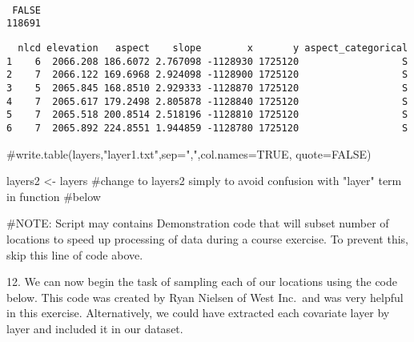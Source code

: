 \documentclass[
  letterpaper,
]{book}
\newenvironment{Shaded}{\begin{snugshade}}{\end{snugshade}}
\newcommand{\CommentTok}[1]{\textcolor[rgb]{0.37,0.37,0.37}{#1}}
\newcommand{\FunctionTok}[1]{\textcolor[rgb]{0.28,0.35,0.67}{#1}}
\newcommand{\NormalTok}[1]{\textcolor[rgb]{0.00,0.23,0.31}{#1}}
\newcommand{\OtherTok}[1]{\textcolor[rgb]{0.00,0.23,0.31}{#1}}
\newcommand{\SpecialCharTok}[1]{\textcolor[rgb]{0.37,0.37,0.37}{#1}}
\begin{document}
\begin{verbatim}

 FALSE 
118691 
\end{verbatim}

\begin{Shaded}
\end{Shaded}

\begin{verbatim}
  nlcd elevation   aspect    slope        x       y aspect_categorical
1    6  2066.208 186.6072 2.767098 -1128930 1725120                  S
2    7  2066.122 169.6968 2.924098 -1128900 1725120                  S
3    5  2065.845 168.8510 2.929333 -1128870 1725120                  S
4    7  2065.617 179.2498 2.805878 -1128840 1725120                  S
5    7  2065.518 200.8514 2.518196 -1128810 1725120                  S
6    7  2065.892 224.8551 1.944859 -1128780 1725120                  S
\end{verbatim}

\begin{Shaded}
\begin{Highlighting}[]
\CommentTok{\#write.table(layers,"layer1.txt",sep=",",col.names=TRUE, quote=FALSE)}

\NormalTok{layers2 }\OtherTok{\textless{}{-}}\NormalTok{ layers }\CommentTok{\#change to layers2 simply to avoid confusion with "layer" term in function }
\CommentTok{\#below}
\end{Highlighting}
\end{Shaded}

\#NOTE: Script may contains Demonstration code that will subset number
of locations to speed up processing of data during a course exercise. To
prevent this, skip this line of code above.

12. We can now begin the task of sampling each of our locations using
the code below. This code was created by Ryan Nielsen of West Inc.~and
was very helpful in this exercise. Alternatively, we could have
extracted each covariate layer by layer and included it in our dataset.
\end{document}
